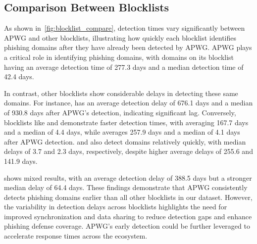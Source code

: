 


\subsection{Comparison Between Blocklists}
As shown in~\autoref{fig:blocklist_compare}, detection times vary significantly between APWG and other blocklists, illustrating how quickly each blocklist identifies phishing domains after they have already been detected by APWG. 
APWG plays a critical role in identifying phishing domains, with domains on its blocklist having an average detection time of 277.3 days and a median detection time of 42.4 days.

In contrast, other blocklists show considerable delays in detecting these same domains. 
For instance,  has an average detection delay of 676.1 days and a median of 930.8 days after APWG's detection, indicating significant lag. 
Conversely, blocklists like  and  demonstrate faster detection times, with  averaging 167.7 days and a median of 4.4 days, while  averages 257.9 days and a median of 4.1 days after APWG detection. 
 and  also detect domains relatively quickly, with median delays of 3.7 and 2.3 days, respectively, despite higher average delays of 255.6 and 141.9 days.

 shows mixed results, with an average detection delay of 388.5 days but a stronger median delay of 64.4 days. 
These findings demonstrate that APWG consistently detects phishing domains earlier than all other blocklists in our dataset. 
However, the variability in detection delays across blocklists highlights the need for improved synchronization and data sharing to reduce detection gaps and enhance phishing defense coverage. APWG’s early detection could be further leveraged to accelerate response times across the ecosystem.


